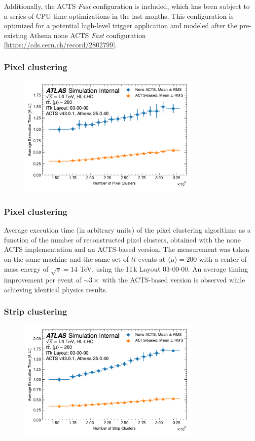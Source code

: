 \documentclass[aspectratio=169]{beamer}
\begin{document}
\begin{frame}
Additionally, the ACTS \textit{Fast} configuration is included, which has been subject to a series of CPU time optimizations in the last months. This configuration is optimized for a potential high-level trigger application and modeled after the pre-existing Athena none ACTS \textit{Fast} configuration [\href{ATLAS-TDR-029-ADD-1}{https://cds.cern.ch/record/2802799}].
\end{frame}

\begin{frame}
\frametitle{Pixel clustering}
\begin{figure}[h]
    \centering
    \includegraphics[width=0.8\textwidth]{plots/clustering_pixel.pdf}
\end{figure}
\end{frame}

\begin{frame}
\frametitle{Pixel clustering}
Average execution time (in arbitrary units) of the pixel clustering algorithms as a function of the number of reconstructed pixel clusters, obtained with the none ACTS implementation and an ACTS-based version. The measurement was taken on the same machine and the same set of $t\bar{t}$ events at $\langle \mu \rangle = 200$ with a center of mass energy of $\sqrt{s}=14$ TeV, using the ITk Layout 03-00-00. An average timing improvement per event of $\sim3\times$ with the ACTS-based version is observed while achieving identical physics results.
\end{frame}

\begin{frame}
\frametitle{Strip clustering}
\begin{figure}[h]
    \centering
    \includegraphics[width=0.8\textwidth]{plots/clustering_strip.pdf}
\end{figure}
\end{frame}
\end{document}
